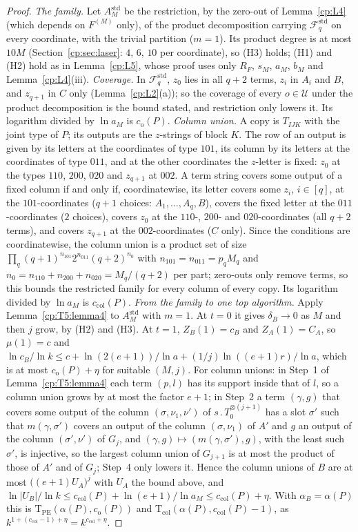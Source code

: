 \documentclass[11pt]{article}
\theoremstyle{definition}
\theoremstyle{remark}
\newcommand{\abs}[1]{\lvert #1\rvert}
\newcommand{\cp}{\mathbin{.}}                 %
\newcommand{\cB}{c_B}                         %
\newcommand{\ZB}{Z_B}                         %
\newcommand{\delB}{\delta_B}                  %
\newcommand{\alB}{\alpha_B}                   %
\newcommand{\co}{c_{\mathrm o}}               %
\newcommand{\ccol}{c_{\mathrm{col}}}          %
\newcommand{\Hcond}[1]{\textup{(H#1)}}        %
\newcommand{\TPE}{\mathrm{T}_{\mathrm{PE}}}   %
\newcommand{\Tcol}{\mathrm{T}_{\mathrm{col}}} %
\newcommand{\Ukept}{\mathcal{U}}              %
\newcommand{\Fstd}{\mathcal{F}^{\mathrm{std}}_q} %
\begin{document}
\begin{proof}
\emph{The family.} Let $A^{\mathrm{std}}_M$ be the restriction, by the zero-out of Lemma~\ref{cp:L4} (which depends on $F^{(M)}$ only), of the product decomposition carrying $\Fstd$ on every coordinate, with the trivial partition ($m=1$). Its product degree is at most $10M$ (Section~\ref{cp:sec:laser}: $4$, $6$, $10$ per coordinate), so \Hcond3{} holds; \Hcond1{} and \Hcond2{} hold as in Lemma~\ref{cp:L5}, whose proof uses only $R_F$, $s_M$, $a_M$, $b_M$ and Lemma~\ref{cp:L4}(iii).
\emph{Coverage.} In $\Fstd$, $z_0$ lies in all $q+2$ terms, $z_i$ in $A_i$ and $B$, and $z_{q+1}$ in $C$ only (Lemma~\ref{cp:L2}(a)); so the coverage of every $o\in\Ukept$ under the product decomposition is the bound stated, and restriction only lowers it. Its logarithm divided by $\ln a_M$ is $\co(P)$.
\emph{Column union.} A copy is $T_{IJK}$ with the joint type of $P$; its outputs are the $z$-strings of block $K$. The row of an output is given by its letters at the coordinates of type $101$, its column by its letters at the coordinates of type $011$, and at the other coordinates the $z$-letter is fixed: $z_0$ at the types $110$, $200$, $020$ and $z_{q+1}$ at $002$. A term string covers some output of a fixed column if and only if, coordinatewise, its letter covers some $z_i$, $i\in[q]$, at the $101$-coordinates ($q+1$ choices: $A_1,\dots,A_q,B$), covers the fixed letter at the $011$-coordinates ($2$ choices), covers $z_0$ at the $110$-, $200$- and $020$-coordinates (all $q+2$ terms), and covers $z_{q+1}$ at the $002$-coordinates ($C$ only). Since the conditions are coordinatewise, the column union is a product set of size $\prod_q(q+1)^{n_{101}}2^{n_{011}}(q+2)^{n_0}$ with $n_{101}=n_{011}=p_qM_q$ and $n_0=n_{110}+n_{200}+n_{020}=M_q/(q+2)$ per part; zero-outs only remove terms, so this bounds the restricted family for every column of every copy. Its logarithm divided by $\ln a_M$ is $\ccol(P)$.
\emph{From the family to one top algorithm.} Apply Lemma~\ref{cp:T5:lemma4} to $A^{\mathrm{std}}_M$ with $m=1$. At $t=0$ it gives $\delB\to0$ as $M$ and then $j$ grow, by \Hcond2{} and \Hcond3. At $t=1$, $\ZB(1)=\cB$ and $Z_A(1)=C_A$, so $\mu(1)=c$ and $\ln\cB/\ln k\le c+\ln(2(e+1))/\ln a+(1/j)\ln((e+1)r)/\ln a$, which is at most $\co(P)+\eta$ for suitable $(M,j)$. For column unions: in Step~1 of Lemma~\ref{cp:T5:lemma4} each term $(p,l)$ has its support inside that of $l$, so a column union grows by at most the factor $e+1$; in Step~2 a term $(\gamma,g)$ that covers some output of the column $(\sigma,\nu_1,\nu')$ of $s\cp T_0^{\otimes(j+1)}$ has a slot $\sigma'$ such that $m(\gamma,\sigma')$ covers an output of the column $(\sigma,\nu_1)$ of $A'$ and $g$ an output of the column $(\sigma',\nu')$ of $G_j$, and $(\gamma,g)\mapsto(m(\gamma,\sigma'),g)$, with the least such $\sigma'$, is injective, so the largest column union of $G_{j+1}$ is at most the product of those of $A'$ and of $G_j$; Step~4 only lowers it. Hence the column unions of $B$ are at most $\bigl((e+1)U_A\bigr)^j$ with $U_A$ the bound above, and $\ln\abs{U_B}/\ln k\le\ccol(P)+\ln(e+1)/\ln a_M\le\ccol(P)+\eta$. With $\alB=\alpha(P)$ this is $\TPE(\alpha(P),\co(P))$ and $\Tcol(\alpha(P),\ccol(P)-1)$, as $k^{1+(\ccol-1)+\eta}=k^{\ccol+\eta}$.
\end{proof}
\end{document}
